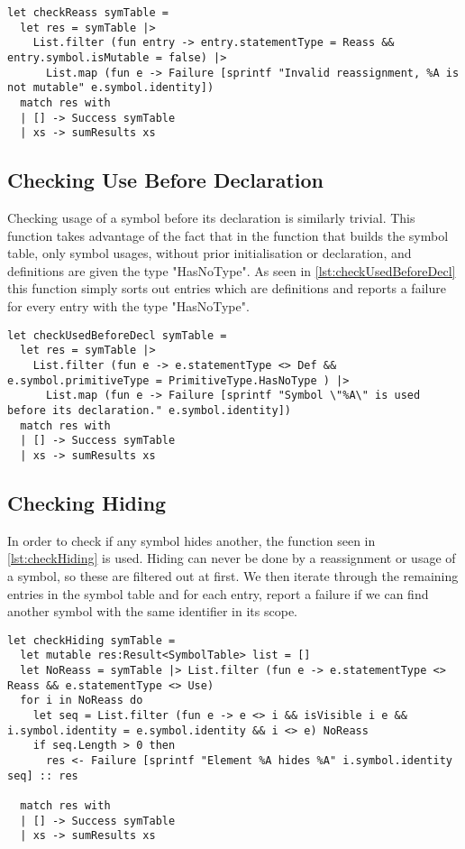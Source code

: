 \begin{lstlisting}[style = fsharp, label = lst:checkReass, caption = {The function responsible for checking illegal reassignments.}]
let checkReass symTable = 
  let res = symTable |> 
    List.filter (fun entry -> entry.statementType = Reass && entry.symbol.isMutable = false) |>
      List.map (fun e -> Failure [sprintf "Invalid reassignment, %A is not mutable" e.symbol.identity])
  match res with
  | [] -> Success symTable
  | xs -> sumResults xs
\end{lstlisting}

\subsection{Checking Use Before Declaration}
Checking usage of a symbol before its declaration is similarly trivial. This function takes advantage of the fact that in the function that builds the symbol table, only symbol usages, without prior initialisation or declaration, and definitions are given the type "HasNoType". 
As seen in \cref{lst:checkUsedBeforeDecl} this function simply sorts out entries which are definitions and reports a failure for every entry with the type "HasNoType".
\begin{lstlisting}[style = fsharp, label = lst:checkUsedBeforeDecl, caption = {The function responsible for checking usage before declaration.}]
let checkUsedBeforeDecl symTable =
  let res = symTable |>
    List.filter (fun e -> e.statementType <> Def && e.symbol.primitiveType = PrimitiveType.HasNoType ) |>
      List.map (fun e -> Failure [sprintf "Symbol \"%A\" is used before its declaration." e.symbol.identity])
  match res with
  | [] -> Success symTable
  | xs -> sumResults xs
\end{lstlisting}

\subsection{Checking Hiding}
In order to check if any symbol hides another, the function seen in \cref{lst:checkHiding} is used. Hiding can never be done by a reassignment or usage of a symbol, so these are filtered out at first. We then iterate through the remaining entries in the symbol table and for each entry, report a failure if we can find another symbol with the same identifier in its scope.

\begin{lstlisting}[style = fsharp, label = lst:checkHiding, caption = {The function responsible for checking hiding.}]
let checkHiding symTable =
  let mutable res:Result<SymbolTable> list = []
  let NoReass = symTable |> List.filter (fun e -> e.statementType <> Reass && e.statementType <> Use)
  for i in NoReass do
    let seq = List.filter (fun e -> e <> i && isVisible i e && i.symbol.identity = e.symbol.identity && i <> e) NoReass
    if seq.Length > 0 then 
      res <- Failure [sprintf "Element %A hides %A" i.symbol.identity seq] :: res

  match res with
  | [] -> Success symTable
  | xs -> sumResults xs
\end{lstlisting}


